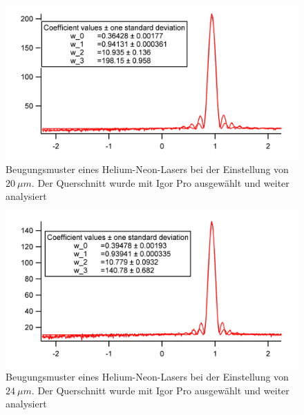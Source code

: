 \begin{figure}[H]
	\centering	
	\begin{minipage}{1\textwidth}
		\includegraphics[width=\columnwidth]{180618/Graph5.png}
	\end{minipage}
	\caption{Beugungsmuster eines Helium-Neon-Lasers bei der Einstellung von $20~\mu m$. Der Querschnitt wurde mit Igor Pro ausgewählt und weiter analysiert }
	\label{HeNe_5}
\end{figure}
\begin{figure}[H]
	\centering	
	\begin{minipage}{1\textwidth}
		\includegraphics[width=\columnwidth]{180618/Graph6.png}
	\end{minipage}
	\caption{Beugungsmuster eines Helium-Neon-Lasers bei der Einstellung von $24~\mu m$. Der Querschnitt wurde mit Igor Pro ausgewählt und weiter analysiert }
	\label{HeNe_6}
\end{figure}





